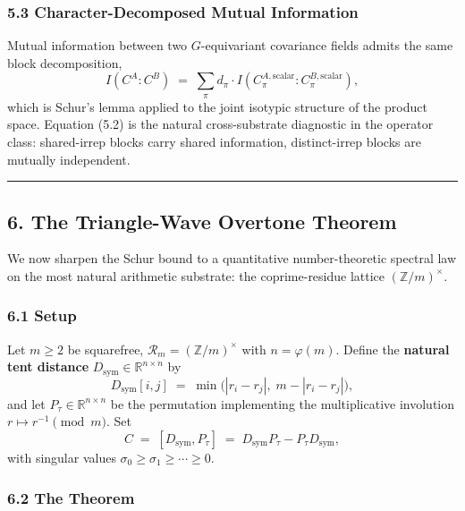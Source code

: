 \documentclass[
  11pt,
]{article}
\begin{document}
\subsubsection{5.3 Character-Decomposed Mutual
Information}\label{character-decomposed-mutual-information}

Mutual information between two \(G\)-equivariant covariance fields
admits the same block decomposition,
\[I(C^A : C^B) \;=\; \sum_\pi d_\pi \cdot I(C_\pi^{A,\text{scalar}} : C_\pi^{B,\text{scalar}}), \tag{5.2}\]
which is Schur's lemma applied to the joint isotypic structure of the
product space. Equation (5.2) is the natural cross-substrate diagnostic
in the operator class: shared-irrep blocks carry shared information,
distinct-irrep blocks are mutually independent.

\begin{center}\rule{0.5\linewidth}{0.5pt}\end{center}

\subsection{6. The Triangle-Wave Overtone
Theorem}\label{the-triangle-wave-overtone-theorem}

We now sharpen the Schur bound to a quantitative number-theoretic
spectral law on the most natural arithmetic substrate: the
coprime-residue lattice \((\mathbb{Z}/m)^\times\).

\subsubsection{6.1 Setup}\label{setup-1}

Let \(m \geq 2\) be squarefree,
\(\mathcal{R}_m = (\mathbb{Z}/m)^\times\) with \(n = \varphi(m)\).
Define the \textbf{natural tent distance}
\(D_\text{sym} \in \mathbb{R}^{n \times n}\) by
\[D_\text{sym}[i, j] \;=\; \min\bigl(|r_i - r_j|,\; m - |r_i - r_j|\bigr), \tag{6.1}\]
and let \(P_\tau \in \mathbb{R}^{n \times n}\) be the permutation
implementing the multiplicative involution \(r \mapsto r^{-1} \pmod m\).
Set
\[C \;=\; [D_\text{sym}, P_\tau] \;=\; D_\text{sym} P_\tau - P_\tau D_\text{sym}, \tag{6.2}\]
with singular values \(\sigma_0 \geq \sigma_1 \geq \cdots \geq 0\).

\subsubsection{6.2 The Theorem}\label{the-theorem}
\end{document}
